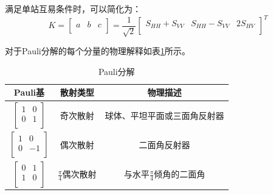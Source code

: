 满足单站互易条件时，可以简化为：
\begin{equation}
    K=\left[ \begin{matrix}
            a & b & c \\
        \end{matrix} \right] =\frac{1}{\sqrt{2}}\left[ \begin{matrix}
            S_{HH}+S_{VV} & S_{HH}-S_{VV} & 2S_{HV} \\
        \end{matrix} \right] ^T
\end{equation}

对于Pauli分解的每个分量的物理解释如表\ref{Pauli table}所示。
\begin{table}[h]
    \caption{Pauli分解}
    \linespread{1.5} %
    \setlength{\arraycolsep}{10pt} %
    \begin{tabular}{|c|c|c|}
        \hline
        Pauli基                 & 散射类型                & 物理描述                             \\ \hline
        $\left[ \begin{matrix}
                            1 & 0 \\
                            0 & 1 \\
                        \end{matrix} \right] $ & 奇次散射                & 球体、平坦平面或三面角反射器           \\ \hline
        $\left[ \begin{matrix}
                            1 & 0  \\
                            0 & -1 \\
                        \end{matrix} \right] $ & 偶次散射                & 二面角反射器                   \\ \hline
        $\left[ \begin{matrix}
                            0 & 1 \\
                            1 & 0 \\
                        \end{matrix} \right] $ & $\frac{\pi}{4}$偶次散射 & 与水平$\frac{\pi}{4}$倾角的二面角 \\ \hline
    \end{tabular}
    \label{Pauli table}
\end{table}

